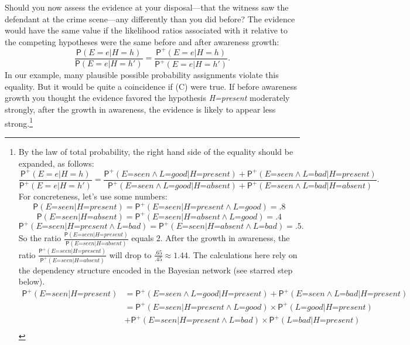 \documentclass[
  11pt,
  dvipsnames,enabledeprecatedfontcommands]{scrartcl}
\newcommand{\pr}[1]{\ensuremath{\mathsf{P}(#1)}}
\newcommand{\ppr}[2]{\ensuremath{\mathsf{P}^{#1}(#2)}}
\begin{document}
Should you now assess the evidence at your disposal---that the witness
saw the defendant at the crime scene---any differently than you did
before? The evidence would have the same value if the likelihood ratios
associated with it relative to the competing hypotheses were the same
before and after awareness growth:
\[\frac{\pr{E=e \vert H=h}}{\pr{E=e \vert H=h'}}= \frac{\ppr{+}{E=e \vert H=h}}{\ppr{+}{E=e \vert H=h'}} \tag{C}.\]
In our example, many plausible possible probability assignments violate
this equality. But it would be quite a coincidence if (C) were true. If
before awareness growth you thought the evidence favored the hypothesis
\textit{H=present} moderately strongly, after the growth in awareness,
the evidence is likely to appear less strong.\footnote{By the law of
  total probability, the right hand side of the equality should be
  expanded, as follows:
  \[\frac{\ppr{+}{E=e \vert H=h}}{\ppr{+}{E=e \vert H=h'}}=\frac{\ppr{+}{\textit{E=seen} \wedge \textit{L=good} \vert \textit{H=present}}+\ppr{+}{\textit{E=seen} \wedge \textit{L=bad} \vert \textit{H=present}}}{\ppr{+}{\textit{E=seen} \wedge \textit{L=good} \vert \textit{H=absent}}+\ppr{+}{\textit{E=seen} \wedge \textit{L=bad} \vert \textit{H=absent}}}.\]
  For concreteness, let's use some numbers:
  \[\pr{\textit{E=seen} \vert \textit{H=present}}=\ppr{+}{\textit{E=seen} \vert \textit{H=present} \wedge \textit{L=good}}=.8\]
  \[\pr{\textit{E=seen} \vert \textit{H=absent}}=\ppr{+}{\textit{E=seen} \vert \textit{H=absent} \wedge \textit{L=good}}=.4\]
  \[\ppr{+}{\textit{E=seen} \vert \textit{H=present} \wedge \textit{L=bad}} = \ppr{+}{\textit{E=seen} \vert \textit{H=absent} \wedge \textit{L=bad}}=.5.\]
  So the ratio
  \(\frac{\pr{\textit{E=seen} \vert \textit{H=present}}}{\pr{\textit{E=seen} \vert \textit{H=absent}}}\)
  equals \(2\). After the growth in awareness, the ratio
  \(\frac{\ppr{+}{\textit{E=seen} \vert \textit{H=present}}}{\ppr{+}{\textit{E=seen} \vert \textit{H=absent}}}\)
  will drop to \(\frac{.65}{.45}\approx 1.44\). The calculations here
  rely on the dependency structure encoded in the Bayesian network (see
  starred step below). \begin{align*}
  \ppr{+}{\textit{E=seen} \vert \textit{H=present}} &= \ppr{+}{\textit{E=seen} \wedge \textit{L=good} \vert \textit{H=present}}+\ppr{+}{\textit{E=seen} \wedge \textit{L=bad} \vert \textit{H=present}}\\
  &= \ppr{+}{\textit{E=seen} \vert \textit{H=present} \wedge \textit{L=good}}  \times \ppr{+}{\textit{L=good} \vert  \textit{H=present} }\\ & +\ppr{+}{\textit{E=seen}  \vert \textit{H=present} \wedge \textit{L=bad}} \times \ppr{+}{\textit{L=bad} \vert  \textit{H=present}}\\

\end{align*}}
\end{document}
